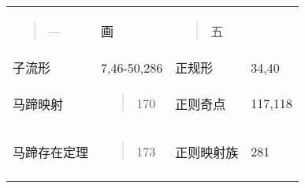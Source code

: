 \documentclass{article}
\begin{document}
\begin{longtable}[]{@{}llll@{}}
\toprule
\endhead
\begin{minipage}[t]{0.22\columnwidth}\raggedright
\begin{quote}
{---}
\end{quote}\strut
\end{minipage} & \begin{minipage}[t]{0.22\columnwidth}\raggedright
画\strut
\end{minipage} & \begin{minipage}[t]{0.22\columnwidth}\raggedright
\begin{quote}
五
\end{quote}\strut
\end{minipage} & \begin{minipage}[t]{0.22\columnwidth}\raggedright
\strut
\end{minipage}\tabularnewline
子流形 & 7,46-50,286 & 正规形 & 34,40\tabularnewline
\begin{minipage}[t]{0.22\columnwidth}\raggedright
马蹄映射\strut
\end{minipage} & \begin{minipage}[t]{0.22\columnwidth}\raggedright
\begin{quote}
170
\end{quote}\strut
\end{minipage} & \begin{minipage}[t]{0.22\columnwidth}\raggedright
正则奇点\strut
\end{minipage} & \begin{minipage}[t]{0.22\columnwidth}\raggedright
117,118\strut
\end{minipage}\tabularnewline
\begin{minipage}[t]{0.22\columnwidth}\raggedright
马蹄存在定理\strut
\end{minipage} & \begin{minipage}[t]{0.22\columnwidth}\raggedright
\begin{quote}
173
\end{quote}\strut
\end{minipage} & \begin{minipage}[t]{0.22\columnwidth}\raggedright
正则映射族\strut
\end{minipage} & \begin{minipage}[t]{0.22\columnwidth}\raggedright
281\strut
\end{minipage}\tabularnewline
\begin{minipage}[t]{0.22\columnwidth}\raggedright

\end{minipage}
\end{longtable}
\end{document}
